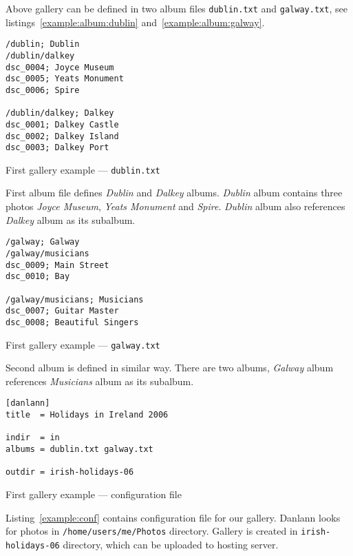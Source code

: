 \documentclass{article}
\begin{document}
Above gallery can be defined in two album files \texttt{dublin.txt} and
\texttt{galway.txt}, see listings~\ref{example:album:dublin}
and~\ref{example:album:galway}.

\begin{listing}
\begin{lstlisting}
/dublin; Dublin
/dublin/dalkey
dsc_0004; Joyce Museum
dsc_0005; Yeats Monument
dsc_0006; Spire

/dublin/dalkey; Dalkey
dsc_0001; Dalkey Castle
dsc_0002; Dalkey Island
dsc_0003; Dalkey Port
\end{lstlisting}
\caption{First gallery example --- \texttt{dublin.txt}}\label{example:album:dublin}
\end{listing}

First album file defines \textit{Dublin} and \textit{Dalkey} albums.
\textit{Dublin} album contains three photos \textit{Joyce Museum},
\textit{Yeats Monument} and \textit{Spire}. \textit{Dublin} album
also references \textit{Dalkey} album as its subalbum.

\begin{listing}
\begin{lstlisting}
/galway; Galway
/galway/musicians
dsc_0009; Main Street
dsc_0010; Bay

/galway/musicians; Musicians
dsc_0007; Guitar Master
dsc_0008; Beautiful Singers
\end{lstlisting}
\caption{First gallery example --- \texttt{galway.txt}}\label{example:album:galway}
\end{listing}

Second album is defined in similar way. There are two albums, \textit{Galway} album references
\textit{Musicians} album as its subalbum.

\begin{listing}
\begin{lstlisting}
[danlann]
title  = Holidays in Ireland 2006

indir  = in
albums = dublin.txt galway.txt

outdir = irish-holidays-06
\end{lstlisting}
\caption{First gallery example --- configuration file}\label{example:conf}
\end{listing}

Listing~\ref{example:conf} contains configuration file for our gallery.
Danlann looks for photos in \texttt{/home/users/me/Photos} directory.
Gallery is created in \texttt{irish-holidays-06} directory, which
can be uploaded to hosting server.
\end{document}
